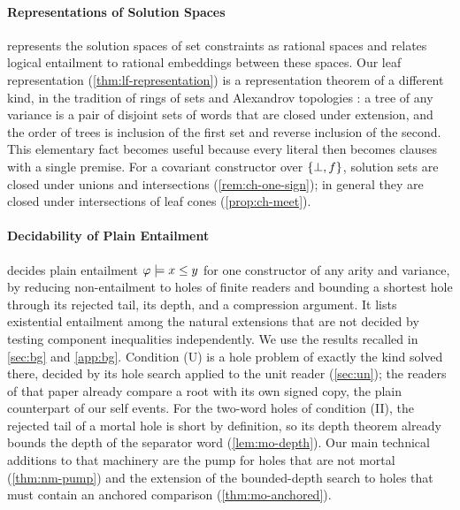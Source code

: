 \paragraph{Representations of Solution Spaces}
\citet{Kozen95} represents the solution spaces of set constraints as rational
spaces and relates logical entailment to rational embeddings between these
spaces. Our leaf representation (\cref{thm:lf-representation}) is a
representation theorem of a different kind, in the tradition of rings of sets
\citep{Birkhoff37} and Alexandrov topologies \citep{Alexandroff37}: a tree of
any variance is a pair of disjoint sets of words that are closed under
extension, and the order of trees is inclusion of the first set and reverse
inclusion of the second. This elementary fact becomes useful because every
literal then becomes clauses with a single premise. For a covariant
constructor over $\{\bot,f\}$, solution sets are closed under unions and intersections
(\cref{rem:ch-one-sign}); in general they are closed under intersections of
leaf cones (\cref{prop:ch-meet}).

\paragraph{Decidability of Plain Entailment}
 decides plain entailment
$\varphi\models x\le y$ for one constructor of any arity and variance, by
reducing non-entailment to holes of finite readers and bounding a shortest hole
through its rejected tail, its depth, and a compression argument. It lists
existential entailment among the natural extensions that are not decided by
testing component inequalities independently. We use the results recalled in
\cref{sec:bg} and \cref{app:bg}. Condition \textup{(U)} is a hole problem of
exactly the kind solved there, decided by its hole search applied to the unit
reader (\cref{sec:un}); the readers of that paper already compare a root with its own
signed copy, the plain counterpart of our self events. For the two-word
holes of condition \textup{(II)}, the rejected tail of a mortal hole is short
by definition, so its depth theorem already bounds the depth of
the separator word (\cref{lem:mo-depth}). Our main technical additions to that
machinery are the pump for holes that are not mortal
(\cref{thm:nm-pump}) and the extension of the bounded-depth search to holes
that must contain an anchored comparison (\cref{thm:mo-anchored}).
